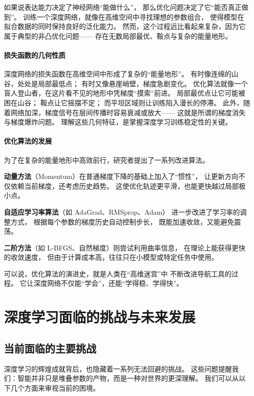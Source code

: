 如果说表达能力决定了神经网络“能做什么”，  
那么优化问题决定了它“能否真正做到”。  
训练一个深度网络，就像在高维空间中寻找理想的参数组合，  
使得模型在拟合数据的同时保持良好的泛化能力。  
然而，这个过程远比看起来复杂，因为它属于典型的非凸优化问题——  
存在无数局部最优、鞍点与复杂的能量地形。

\paragraph{损失函数的几何性质}  
深度网络的损失函数在高维空间中形成了复杂的“能量地形”。  
有时像连绵的山谷，处处是局部最低点；  
有时又像悬崖峭壁，梯度急剧变化。  
优化算法就像一个盲人登山者，在这片看不见的地形中凭梯度“摸索”前进。  
局部最优点让它可能被困在山谷；  
鞍点让它摇摆不定；  
而平坦区域则让训练陷入漫长的停滞。  
此外，随着网络加深，梯度信号在层间传播时容易衰减或放大——  
这就是所谓的梯度消失与梯度爆炸问题。  
理解这些几何特征，是掌握深度学习训练稳定性的关键。

\paragraph{优化算法的发展}  
为了在复杂的能量地形中高效前行，研究者提出了一系列改进算法。  

{\bf 动量方法}（Momentum）在普通梯度下降的基础上加入了“惯性”，  
让更新方向不仅依赖当前梯度，还考虑历史趋势。  
这使优化轨迹更平滑，也能更快越过局部极小点。  

{\bf 自适应学习率算法}（如 AdaGrad、RMSprop、Adam）  
进一步改进了学习率的调整方式，  
根据每个参数的梯度历史自动控制步长，  
既能加速收敛，又能避免震荡。  

{\bf 二阶方法}（如 L-BFGS、自然梯度）则尝试利用曲率信息，  
在理论上能获得更快的收敛速度，  
但由于计算成本高，往往只在小模型或特定任务中使用。  

可以说，优化算法的演进史，就是人类在“高维迷宫”中  
不断改进导航工具的过程。  
它让深度网络不仅能“学会”，还能“学得稳、学得快”。

\section{深度学习面临的挑战与未来发展}

\subsection{当前面临的主要挑战}

深度学习的辉煌成就背后，也隐藏着一系列无法回避的挑战。  
这些问题提醒我们：智能并非只是堆叠参数的产物，而是一种对世界的更深理解。  
我们可以从以下几个方面来审视当前的困境。  

